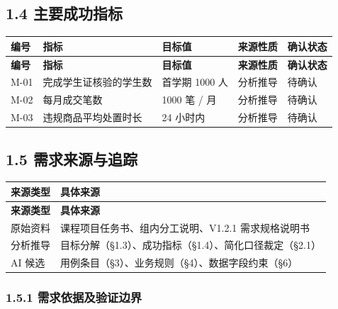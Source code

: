 \documentclass[12pt,a4paper]{ctexart}
\begin{document}
\subsection*{1.4 主要成功指标}

{\footnotesize
\begin{longtable}{|p{1.57cm}|p{5.37cm}|p{3.88cm}|p{2.59cm}|p{2.59cm}|}
\hline
\textbf{编号} & \textbf{指标} & \textbf{目标值} & \textbf{来源性质} & \textbf{确认状态} \\
\hline
\endfirsthead
\hline
\textbf{编号} & \textbf{指标} & \textbf{目标值} & \textbf{来源性质} & \textbf{确认状态} \\
\hline
\endhead
\hline
\endfoot
M-01 & 完成学生证核验的学生数 & 首学期 1000 人 & 分析推导 & 待确认 \\
\hline
M-02 & 每月成交笔数 & 1000 笔 / 月 & 分析推导 & 待确认 \\
\hline
M-03 & 违规商品平均处置时长 & 24 小时内 & 分析推导 & 待确认 \\
\hline
\end{longtable}
}



\subsection*{1.5 需求来源与追踪}

{\footnotesize
\begin{longtable}{|p{2.75cm}|p{13.25cm}|}
\hline
\textbf{来源类型} & \textbf{具体来源} \\
\hline
\endfirsthead
\hline
\textbf{来源类型} & \textbf{具体来源} \\
\hline
\endhead
\hline
\endfoot
原始资料 & 课程项目任务书、组内分工说明、V1.2.1 需求规格说明书 \\
\hline
分析推导 & 目标分解（§1.3）、成功指标（§1.4）、简化口径裁定（§2.1） \\
\hline
AI 候选 & 用例条目（§3）、业务规则（§4）、数据字段约束（§6） \\
\hline
\end{longtable}
}


\subsubsection*{1.5.1 需求依据及验证边界}
\end{document}
